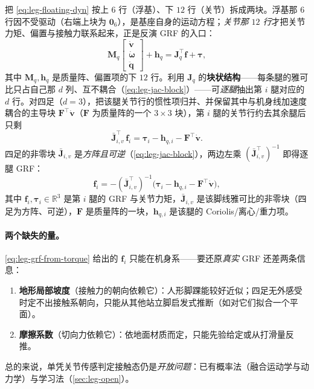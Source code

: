 \begin{derivation}
把 \cref{eq:leg-floating-dyn} 按上 $6$ 行（浮基）、下 $12$ 行（关节）拆成两块。浮基那 $6$ 行因不受驱动（右端上块为 $\mathbf{0}_6$），是基座自身的运动方程；\emph{关节那 $12$ 行}才把关节力矩、偏置与接触力联系起来，正是反演 GRF 的入口：
\[
  \mathbf{M}_q\begin{bmatrix}\dot{\mathbf{v}}\\\dot{\boldsymbol{\omega}}\\\ddot{\mathbf{q}}\end{bmatrix}+\mathbf{h}_q=\mathbf{J}_q^\top\mathbf{f}+\boldsymbol{\tau},
\]
其中 $\mathbf{M}_q,\mathbf{h}_q$ 是质量阵、偏置项的下 $12$ 行。利用 $\mathbf{J}_q$ 的\textbf{块状结构}——每条腿的雅可比只占自己那 $d$ 列、互不耦合（\cref{eq:leg-jac-block}）——可\emph{逐腿}抽出第 $i$ 腿对应的 $d$ 行。对四足（$d{=}3$），把该腿关节行的惯性项归并、并保留其中与机身线加速度耦合的主导块 $\mathbf{F}^\top\dot{\mathbf{v}}$（$\mathbf{F}$ 为质量阵的一个 $3\times3$ 块），第 $i$ 腿的关节行约去其余腿后只剩
\[
  \bar{\mathbf{J}}_{i,v}^\top\,\mathbf{f}_i=\boldsymbol{\tau}_i-\mathbf{h}_{q,i}-\mathbf{F}^\top\dot{\mathbf{v}}.
\]
四足的非零块 $\bar{\mathbf{J}}_{i,v}$ 是\emph{方阵且可逆}（\cref{eq:leg-jac-block}），两边左乘 $(\bar{\mathbf{J}}_{i,v}^\top)^{-1}$ 即得逐腿 GRF：
\begin{equation}
  \mathbf{f}_i=-(\bar{\mathbf{J}}_{i,v}^\top)^{-1}\big(\boldsymbol{\tau}_i-\mathbf{h}_{q,i}-\mathbf{F}^\top\dot{\mathbf{v}}\big),
  \label{eq:leg-grf-from-torque}
\end{equation}
其中 $\mathbf{f}_i,\boldsymbol{\tau}_i\in\mathbb{R}^3$ 是第 $i$ 腿的 GRF 与关节力矩，$\bar{\mathbf{J}}_{i,v}$ 是该脚线雅可比的非零块（四足为方阵、可逆），$\mathbf{F}$ 是质量阵的一块，$\mathbf{h}_{q,i}$ 是该腿的 Coriolis/离心/重力项。
\end{derivation}

\paragraph{两个缺失的量。}
\cref{eq:leg-grf-from-torque} 给出的 $\mathbf{f}_i$ 只能在机身系——要还原\emph{真实} GRF 还差两条信息：
\begin{enumerate}
  \item \textbf{地形局部坡度}（接触力的朝向依赖它）：人形脚踝能较好近似；四足无外感受时定不出接触系朝向，只能从其他站立脚启发式推断（如对它们拟合一个平面）。
  \item \textbf{摩擦系数}（切向力依赖它）：依地面材质而定，只能先验给定或从打滑量反推\cite{carlone2026handbook}。
\end{enumerate}
总的来说，单凭关节传感判定接触态仍是\emph{开放问题}：已有概率法（融合运动学与动力学）与学习法（\cref{sec:leg-open}）。

